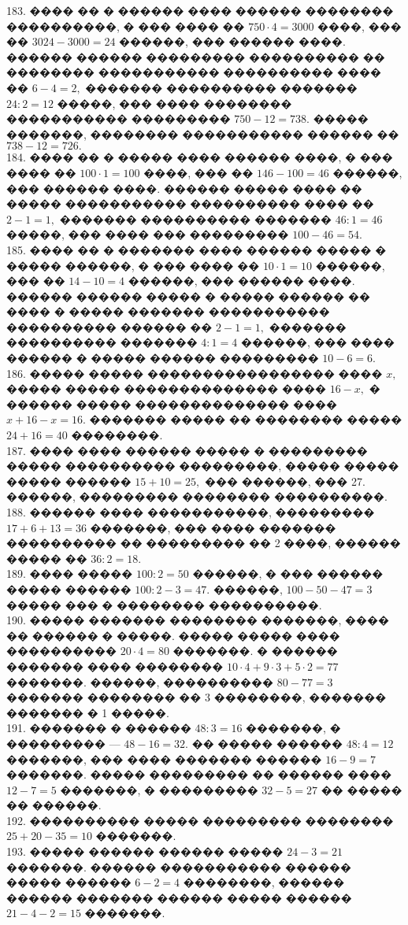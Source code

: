 \documentclass[12pt]{article}
\begin{document}
183. ���� �� � ������ ���� ������ �������� ����������, � ��� ���� �� $750\cdot4=3000$ ����, ��� �� $3024-3000=24$ ������, ��� ������ ����. ������ ������ ��������� ���������� �� �������� ����������� ���������� ���� �� $6-4=2,$ ������� ���������� ������� $24:2=12$ �����, ��� ���� �������� ����������� ��������� $750-12=738.$ ����� �������, �������� ����������� ������ �� $738-12=726.$\\
184. ���� �� � ����� ���� ������ ����, � ��� ���� �� $100\cdot1=100$ ����, ��� �� $146-100=46$ ������, ��� ������ ����. ������ ����� ���� �� ����� ����������� ���������� ���� �� $2-1=1,$ ������� ���������� ������� $46:1=46$ �����, ��� ���� ��� ��������� $100-46=54.$\\
185. ���� �� � ������� ���� ������ ����� � ����� ������, � ��� ���� �� $10\cdot1=10$ ������, ��� �� $14-10=4$ ������, ��� ������ ����. ������ ������ ����� � ����� ������ �� ���� � ����� ������� ����������� ���������� ������ �� $2-1=1,$ ������� ���������� ������� $4:1=4$ ������, ��� ���� ������ � ����� ������ ��������� $10-6=6.$\\
186. ����� ����� ����������������� ���� $x,$ ����� ����� �������������� ���� $16-x,$ � ������ ����� �������������� ���� $x+16-x=16.$ ������� ����� �� �������� ����� $24+16=40$ ��������.\\
187. ���� ���� ������ ����� � ��������� ����� ���������� ���������, ����� ����� ����� ������ $15+10=25,$ ��� ������, ��� 27. ������, ��������� �������� ����������.\\
188. ������ ���� �����������, ��������� $17+6+13=36$ �������, ��� ���� ������� ���������� �� ��������� �� 2 ����, ������ ����� �� $36:2=18.$\\
189. ���� ����� $100:2=50$ ������, � ��� ������ ����� ������ $100:2-3=47.$ ������, $100-50-47=3$ ����� ��� � �������� ����������.\\
190. ����� ������� �������� �������, ���� �� ������ � �����. ����� ����� ���� ���������� $20\cdot4=80$ �������. � ������ ������� ���� �������� $10\cdot4+9\cdot3+5\cdot2=77$ �������. ������, ���������� $80-77=3$ ������� �������� �� 3 ��������, ������� ������� � 1 �����.\\
191. ������� � ������ $48:3=16$ �������, � ��������� --- $48-16=32.$ �� ����� ������ $48:4=12$ �������, ��� ���� ������� ������ $16-9=7$ �������. ����� ��������� �� ������ ���� $12-7=5$ �������, � ��������� $32-5=27$ �� ����� �� ������.\\
192. ���������� ����� ��������� �������� $25+20-35=10$ �������.\\
193. ����� ������ ������ ����� $24-3=21$ �������. ������ ����������� ������ ����� ������ $6-2=4$ ��������, ������ ������ ������� ������ ����� ������ $21-4-2=15$ �������.\\
\end{document}
